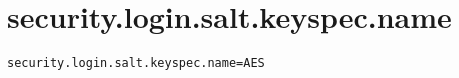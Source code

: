 \section{security.login.salt.keyspec.name}
\label{configuration:SecurityLoginSaltKeyspecName}
\AvailableInJavaOnly{\TODO}
\begin{lstlisting}[style=Props,caption={Usage example for \textit{security.login.salt.keyspec.name}}]
security.login.salt.keyspec.name=AES
\end{lstlisting}